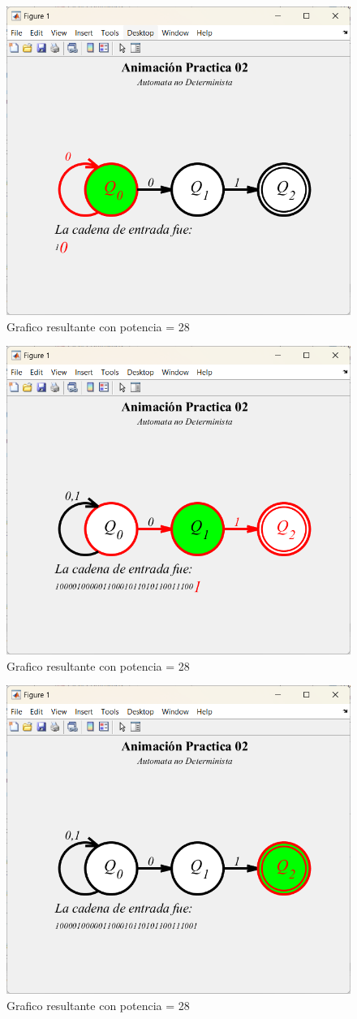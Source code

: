 \documentclass{article}
\begin{document}
\begin{figure}[H]
    \centering
    \includegraphics[width=0.7\linewidth]{AutomataQ0.png}
    \caption{Grafico resultante con potencia = 28}\label{AutomataQ0}
\end{figure}

\begin{figure}[H]
    \centering
    \includegraphics[width=0.7\linewidth]{AutomataQ1.png}
    \caption{Grafico resultante con potencia = 28}\label{AutomataQ1}
\end{figure}

\begin{figure}[H]
    \centering
    \includegraphics[width=0.7\linewidth]{AutomataQ2.png}
    \caption{Grafico resultante con potencia = 28}\label{AutomataQ2}
\end{figure}
\end{document}
